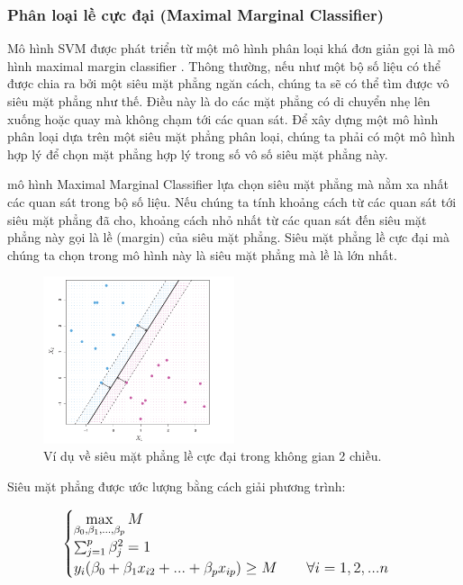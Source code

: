 \documentclass[a4paper]{report}\usepackage[]{graphicx}\usepackage[]{color}
\begin{document}
\subsubsection{Phân loại lề cực đại (Maximal Marginal Classifier)}
Mô hình SVM được phát triển từ một mô hình phân loại khá đơn giản gọi là mô hình maximal margin classifier \parencite{boser1992training}. Thông thường, nếu như một bộ số liệu có thể được chia ra bởi một siêu mặt phẳng ngăn cách, chúng ta sẽ có thể tìm được vô siêu mặt phẳng như thế. Điều này là do các mặt phẳng có di chuyển nhẹ lên xuống hoặc quay mà không chạm tới các quan sát. Để xây dựng một mô hình phân loại dựa trên một siêu mặt phẳng phân loại,  chúng ta phải có một mô hình hợp lý để chọn mặt phẳng hợp lý trong số vô số siêu mặt phẳng này.

mô hình Maximal Marginal Classifier lựa chọn siêu mặt phẳng mà nằm xa nhất các quan sát trong bộ số liệu. Nếu chúng ta tính khoảng cách từ các quan sát tới siêu mặt phẳng đã cho, khoảng cách nhỏ nhất từ các quan sát đến siêu mặt phẳng này gọi là lề (margin) của siêu mặt phẳng. Siêu mặt phẳng lề cực đại mà chúng ta chọn trong mô hình này là siêu mặt phẳng mà lề là lớn nhất.

\begin{figure}
  \centering
   \includegraphics[width=0.5\textwidth]{./Figures/maxim_margin_example.png}
   \caption{Ví dụ về siêu mặt phẳng lề cực đại trong không gian 2 chiều.}
   \label{fig:maxim_margin_example}
\end{figure}

Siêu mặt phẳng được ước lượng bằng cách giải phương trình:


 $$
\large
\begin{cases}
\max\limits_{\beta_0, \beta_1,...,\beta_p}M\\

\sum_{j = 1}^p \beta_j^2 = 1\\

y_i(\beta_0 + \beta_1x_{i2} + ... + \beta_px_{ip}) \geq M \qquad \forall i = 1, 2, ...n
\end{cases}
$$
\end{document}
